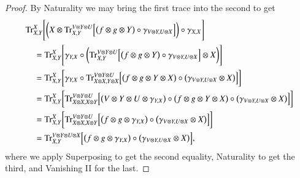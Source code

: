 \documentclass{amsart}
\def\tn{\textnormal}
\def\Trace{\tn{Tr}}
\theoremstyle{remark}
\theoremstyle{definition}
\begin{document}
\begin{proof}
 By Naturality we may bring the first trace into the second to get
 \begin{align*}
  &\Trace^X_{X,Y}\Bigg[\bigg(X\otimes \Trace^{V\otimes Y\otimes U}_{X,Y}\Big[\big(f\otimes g\otimes Y\big)\circ\gamma_{V\otimes Y,U\otimes X}\Big]\bigg)\circ\gamma_{X,X}\Bigg]\\
  &\quad=\Trace^X_{X,Y}\Bigg[\gamma_{Y,X}\circ\bigg(\Trace^{V\otimes Y\otimes U}_{X,Y}\Big[\big(f\otimes g\otimes Y\big)\circ\gamma_{V\otimes Y,U\otimes X}\Big]\otimes X\bigg)\Bigg]\\
  &\quad=\Trace^X_{X,Y}\bigg[\gamma_{Y,X}\circ\Trace^{V\otimes Y\otimes U}_{X\otimes X,Y\otimes X}\Big[\big(f\otimes g\otimes Y\otimes X\big)\circ\big(\gamma_{V\otimes Y,U\otimes X}\otimes X\big)\Big]\bigg]\\
  &\quad=\Trace^X_{X,Y}\bigg[\Trace^{V\otimes Y\otimes U}_{X\otimes X,X\otimes Y}\Big[\big(V\otimes Y\otimes U\otimes \gamma_{Y,X}\big)\circ\big(f\otimes g\otimes Y\otimes X\big)\circ\big(\gamma_{V\otimes Y,U\otimes X}\otimes X\big)\Big]\bigg]\\
  &\quad=\Trace^X_{X,Y}\bigg[\Trace^{V\otimes Y\otimes U}_{X\otimes X,X\otimes Y}\Big[\big(f\otimes g\otimes \gamma_{Y,X}\big)\circ\big(\gamma_{V\otimes Y,U\otimes X}\otimes X\big)\Big]\bigg]\\
  &\quad=\Trace^{V\otimes Y\otimes U\otimes X}_{X,Y}\Big[\big(f\otimes g\otimes \gamma_{Y,X}\big)\circ\big(\gamma_{V\otimes Y,U\otimes X}\otimes X\big)\Big],
 \end{align*}
 where we apply Superposing to get the second equality, Naturality to get the third, and Vanishing II for the last.
 

\end{proof}
\end{document}
